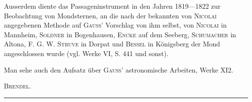 Ausserdem diente das Passageninstrument in den Jahren 1819—1822 zur Beobachtung von Mondsternen, an die nach der bekannten von \textsc{Nicolai} angegebenen Methode auf \textsc{Gauss}’ Vorschlag von ihm selbst, von \textsc{Nicolai} in Mannheim, \textsc{Soldner} in Bogenhausen, \textsc{Encke} auf dem Seeberg, \textsc{Schumacher} in Altona, F. G. W. \textsc{Struve} in Dorpat und \textsc{Bessel} in Königsberg der Mond angeschlossen wurde (vgl. Werke VI, S. 441 und sonst).

Man sehe auch den Aufsatz über \textsc{Gauss}’ astronomische Arbeiten, Werke XI2.
\begin{flushright}\textsc{Brendel}.\end{flushright}
\begin{center}\rule{.24\textwidth}{.3pt}\end{center}
\par\endgroup
\clearpage\endgroup
